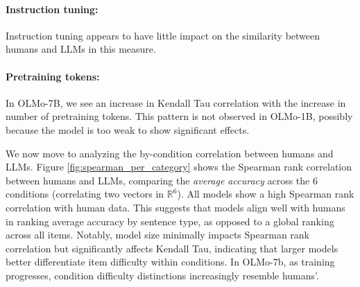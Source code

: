 \paragraph{Instruction tuning:} Instruction tuning appears to have little impact on the similarity between humans and LLMs in this measure.

\paragraph{Pretraining tokens:} In OLMo-7B, we see an increase in Kendall Tau correlation with the increase in number of pretraining tokens. This pattern is not observed in OLMo-1B, possibly because the model is too weak to show significant effects. 

We now move to analyzing the by-condition correlation between humans and LLMs.
Figure \ref{fig:spearman_per_category} shows the Spearman rank correlation between humans and LLMs, comparing the \emph{average accuracy} across the 6 conditions (correlating two vectors in $\mathbb{R}^6$). All models show a high Spearman rank correlation with human data. This suggests that models align well with humans in ranking average accuracy by sentence type, as opposed to a global ranking across all items. Notably, model size minimally impacts Spearman rank correlation but significantly affects Kendall Tau, indicating that larger models better differentiate item difficulty within conditions. In OLMo-7b, as training progresses, condition difficulty distinctions increasingly resemble humans'.





